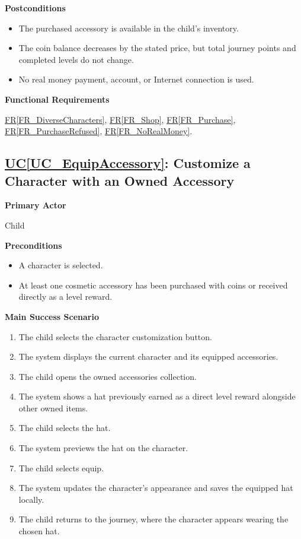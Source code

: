 \documentclass[12pt]{article}
\newcounter{ucnum} %
\newcommand{\ucref}[1]{\hyperref[#1]{UC\ref*{#1}}}
\newcommand{\rref}[1]{\hyperref[#1]{FR\ref*{#1}}}
\begin{document}
\textbf{Postconditions}
\begin{itemize}
    \item The purchased accessory is available in the child's inventory.
    \item The coin balance decreases by the stated price, but total
    journey points and completed levels do not change.
    \item No real money payment, account, or Internet connection is used.
\end{itemize}

\textbf{Functional Requirements}

\rref{FR_DiverseCharacters}, \rref{FR_Shop}, \rref{FR_Purchase}, \rref{FR_PurchaseRefused}, \rref{FR_NoRealMoney}.

\label{UC_EquipAccessory}
\subsection{\ucref{UC_EquipAccessory}: Customize a Character with an Owned Accessory}

\textbf{Primary Actor}

Child

\textbf{Preconditions}
\begin{itemize}
    \item A character is selected.
    \item At least one cosmetic accessory has been purchased
    with coins or received directly as a level reward.
\end{itemize}

\textbf{Main Success Scenario}
\begin{enumerate}
    \item The child selects the character customization button.
    \item The system displays the current character and its
    equipped accessories.
    \item The child opens the owned accessories collection.
    \item The system shows a hat previously earned as a direct
    level reward alongside other owned items.
    \item The child selects the hat.
    \item The system previews the hat on the character.
    \item The child selects equip.
    \item The system updates the character's appearance and saves
    the equipped hat locally.
    \item The child returns to the journey, where the character
    appears wearing the chosen hat.
\end{enumerate}
\end{document}
